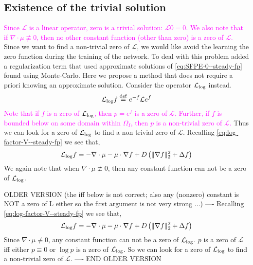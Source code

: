 \subsection{Existence of the trivial solution}\label{ssec-exist-0--steady-fp} \textcolor{magenta}{Since $\mathcal L$ is a linear operator, zero is a trivial solution: $\mathcal L 0 = 0$. We also note that if $\nabla \cdot \mu \not\equiv 0$, then no other constant function (other than zero) is a zero of $\mathcal L$.} Since we want to find a non-trivial zero of $\mathcal L$, we would like avoid the learning the zero function during the training of the network. To deal with this problem \cite{zhai2022deep} added a regularization term that used approximate solutions of \eqref{eq:SFPE-0--steady-fp} found using Monte-Carlo. Here we propose a method that does not require a priori knowing an approximate solution. Consider the operator $\mathcal L_{\rm log}$ instead.
\begin{align}
    \mathcal L_{\rm log}f \stackrel{\rm def}{=} e^{-f}\mathcal L e^f\label{eq:def-log-FPO--steady-fp}
\end{align}
\textcolor{magenta}{Note that if $f$ is a zero of $\mathcal L_{\rm log}$, then $p = e^f$ is a zero of $\mathcal{L}$. Further, if $f$ is bounded below on some domain within $\Omega_I$, then $p$ is a non-trivial zero of $\mathcal{L}$.} Thus we can look for a zero of $\mathcal L_{\rm log}$ to find a non-trivial zero of $\mathcal L$. Recalling \eqref{eq:log-factor-V--steady-fp} we see that,
\begin{align}
    \mathcal L_{\rm log}f=
    -\nabla\cdot \mu - \mu \cdot \nabla f + D\left(\|\nabla f\|_2^2 + \Delta f\right)\label{eq:log-FPO--steady-fp}
\end{align}
We again note that when $\nabla\cdot\mu\not\equiv0$, then any constant function can not be a zero of $\mathcal L_{\rm log}$. 


OLDER VERSION (the iff below is not correct; also any (nonzero) constant is NOT a zero of L either so the first argument is not very strong  ...) ---- Recalling \eqref{eq:log-factor-V--steady-fp} we see that,
\begin{align}
    \mathcal L_{\rm log}f=
    -\nabla\cdot \mu - \mu \cdot \nabla f + D\left(\|\nabla f\|_2^2 + \Delta f\right)\label{eq:log-FPO-old--steady-fp}
\end{align}
Since $\nabla\cdot\mu\not\equiv0$, any constant function can not be a zero of $\mathcal L_{\rm log}$. $p$ is a zero of $\mathcal L$ iff either $p\equiv0$ or $\log p$ is a zero of $\mathcal L_{\rm log}$. So we can look for a zero of $\mathcal L_{\rm log}$ to find a non-trivial zero of $\mathcal L$. ---- END OLDER VERSION

